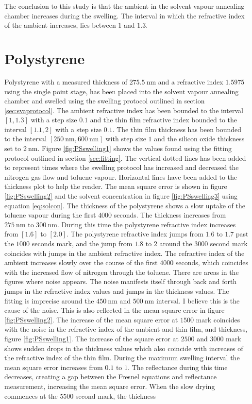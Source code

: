 \documentclass[MasterThesisMain.tex]{subfiles}
\begin{document}
The conclusion to this study is that the ambient in the solvent vapour annealing chamber increases during the swelling. The interval in which the refractive index of the ambient increases, lies between $1$ and $1.3$. 
	
\section{Polystyrene}
Polystyrene with a measured thickness of $\SI{275.5}{\nano\meter}$ and a refractive index $1.5975$ using the single point stage, has been placed into the solvent vapour annealing chamber and swelled using the swelling protocol outlined in section \ref{sec:svaprotocol}. The ambient refractive index has been bounded to the interval $[1,1.3]$ with a step size $0.1$ and the thin film refractive index bounded to the interval $[1.1,2]$ with a step size $0.1$. The thin film thickness has been bounded to the interval $[\SI{250}{\nano\meter},\SI{600}{\nano\meter}]$ with step size $1$ and the silicon oxide thickness set to $\SI{2}{\nano\meter}$. Figure \ref{fig:PSswelling1} shows the values found using the fitting protocol outlined in section \ref{sec:fitting}. The vertical dotted lines has been added to represent times where the swelling protocol has increased and decreased the nitrogen gas flow and toluene vapour. Horizontal lines have been added to the thickness plot to help the reader. The mean square error is shown in figure \ref{fig:PSswelling2} and the solvent concentration in figure \ref{fig:PSswelling3} using equation \ref{eq:solcon}. The thickness of the polystyrene shows a slow uptake of the toluene vapour during the first $4000$ seconds. The thickness increases from $\SI{275}{\nano\meter}$ to $\SI{300}{\nano\meter}$. During this time the polystyrene refractive index increases from $[1.6]$ to $[2.0]$. The polystyrene refractive index jumps from $1.6$ to $1.7$ past the $1000$ seconds mark, and the jump from $1.8$ to $2$ around the $3000$ second mark coincides with jumps in the ambient refractive index. The refractive index of the ambient increases slowly over the course of the first $4000$ seconds, which coincides with the increased flow of nitrogen through the toluene. There are areas in the figures where noise appears. The noise manifests itself through back and forth jumps in the refractive index values and jumps in the thickness values. The fitting is imprecise around the $\SI{450}{\nano\meter}$ and $\SI{500}{\nano\meter}$ interval. I believe this is the cause of the noise. This is also reflected in the mean square error in figure \ref{fig:PSswelling2}. The increase of the mean square error at $1500$ mark coincides with the noise in the refractive index of the ambient and thin film, and thickness, figure \ref{fig:PSswelling1}. The increase of the square error at $2500$ and $3000$ mark shows sudden drops in the thickness values which also coincide with increases of the refractive index of the thin film. During the maximum swelling interval the mean square error increases from $0.1$ to $1$. The reflectance during this time decreases, creating a gap between the Fresnel equations and reflectance measurement, increasing the mean square error. When the slow drying commences at the $5500$ second mark, the thickness 
\end{document}
